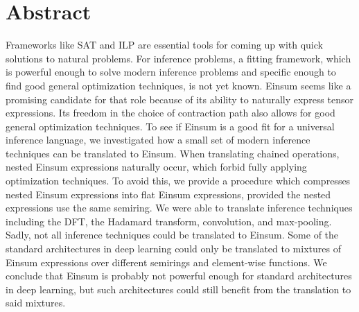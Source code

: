 \chapter{Abstract}

Frameworks like SAT and ILP are essential tools for coming up with quick solutions to natural problems.
For inference problems, a fitting framework, which is powerful enough to solve modern inference problems and specific enough to find good general optimization techniques, is not yet known.
Einsum seems like a promising candidate for that role because of its ability to naturally express tensor expressions.
Its freedom in the choice of contraction path also allows for good general optimization techniques.
To see if Einsum is a good fit for a universal inference language,
we investigated how a small set of modern inference techniques can be translated to Einsum.
When translating chained operations, nested Einsum expressions naturally occur, which forbid fully applying optimization techniques.
To avoid this, we provide a procedure which compresses nested Einsum expressions into flat Einsum expressions, provided the nested expressions use the same semiring.
We were able to translate inference techniques including the DFT, the Hadamard transform, convolution, and max-pooling.
Sadly, not all inference techniques could be translated to Einsum.
Some of the standard architectures in deep learning could only be translated to mixtures of Einsum expressions over different semirings and element-wise functions.
We conclude that Einsum is probably not powerful enough for standard architectures in deep learning,
but such architectures could still benefit from the translation to said mixtures.

